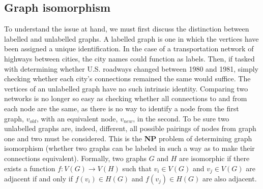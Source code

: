 \documentclass[11pt]{article}
\begin{document}
\subsection{Graph isomorphism}
\indent To understand the issue at hand, we must first discuss the distinction between labelled and unlabelled graphs. A labelled graph is one in which the vertices have been assigned a unique identification. In the case of a transportation network of highways between cities, the city names could function as labels. Then, if tasked with determining whether U.S. roadways changed between 1980 and 1981, simply checking whether each city's connections remained the same would suffice. The vertices of an unlabelled graph have no such intrinsic identity. Comparing two networks is no longer so easy as checking whether all connections to and from each node are the same, as there is no way to identify a node from the first graph, $v_{old}$, with an equivalent node, $v_{new}$, in the second. To be sure two unlabelled graphs are, indeed, different, all possible pairings of nodes from graph one and two must be considered. This is the \textbf{NP} problem of determining graph isomorphism (whether two graphs can be labeled in such a way as to make their connections equivalent). Formally, two graphs $G$ and $H$ are isomorphic if there exists a function $f:V(G) \rightarrow V(H)$ such that $v_{i} \in V(G)$ and $v_{j} \in V(G)$ are adjacent if and only if $f(v_{i}) \in H(G)$ and $f(v_{j}) \in H(G)$ are also adjacent. \vspace{1mm}
\end{document}
